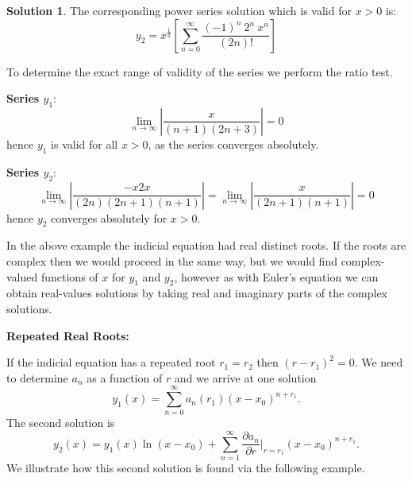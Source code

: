 \documentclass{article}
\theoremstyle{plain}
\theoremstyle{definition}
\newtheorem*{sol}{Solution}
\numberwithin{equation}{section}
\begin{document}
\begin{tcolorbox}
\begin{sol}
        The corresponding power series solution which is valid for $x>0$ is:
        \[ y_2 = x^{\frac{1}{2}} \left[ \sum_{n=0}^{\infty} \frac{(-1)^n \ 2^n \ x^n}{(2n)!} \right] \]

        To determine the exact range of validity of the series we perform the ratio test.
        
        \textbf{Series $y_1$}:
        \[\lim_{n\to \infty} \left \vert \frac{x}{(n+1)(2n+3)} \right \vert = 0\]
        hence $y_1$ is valid for all $x>0$, as the series converges absolutely.

        \textbf{Series $y_2$}:
        \[\lim_{n\to \infty} \left \vert \frac{-x2x}{(2n)(2n+1)(n+1)} \right \vert = \lim_{n\to \infty} \left \vert \frac{x}{(2n+1)(n+1)} \right \vert = 0 \]
        hence $y_2$ converges absolutely for $x>0$.
    \end{sol}
\end{tcolorbox}

In the above example the indicial equation had real distinct roots. If the roots are complex then we would proceed in the same way, but we would find complex-valued functions of $x$ for $y_1$ and $y_2$, however as with Euler's equation we can obtain real-values solutions by taking real and imaginary parts of the complex solutions.

\textbf{Repeated Real Roots:}

If the indicial equation has a repeated root $r_1=r_2$ then $(r-r_1)^2=0$. We need to determine $a_n$ as a function of $r$ and we arrive at one solution
\[
y_1(x) = \sum_{n=0}^{\infty} a_n(r_1)(x-x_0)^{n+r_1}.
\]
The second solution is
\[
y_2(x) = y_1(x)\ln (x-x_0) + \sum_{n=1}^{\infty} \frac{\partial a_n}{\partial r}\Big\vert_{r=r_1} (x-x_0)^{n+r_1}.
\]
We illustrate how this second solution is found via the following example.
\end{document}
